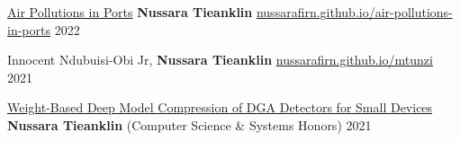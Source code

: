 \begin{cventries}

\cvpub
      { \href{https://nussarafirn.github.io/air-pollutions-in-ports}{Air Pollutions in Ports}} %
    {\textbf{Nussara Tieanklin}} %
    { \href{https://nussarafirn.github.io/air-pollutions-in-ports}{nussarafirn.github.io/air-pollutions-in-ports}} %
    {2022} %

\cvpub
    {} %
    {Innocent Ndubuisi-Obi Jr, \textbf{Nussara Tieanklin}} %
    { \href{https://nussarafirn.github.io/mtunzi}{nussarafirn.github.io/mtunzi}} %
    {2021} %


    \cvpub
        {\href{https://www.tacoma.uw.edu/sites/default/files/2021-08/tieanklin_nussara_senior_thesis-2021.pdf}{Weight-Based Deep Model Compression of DGA Detectors for Small Devices}} %
        {\textbf{Nussara Tieanklin} (Computer Science \& Systems Honors)} 
        {} %
        {2021} %
\end{cventries}
